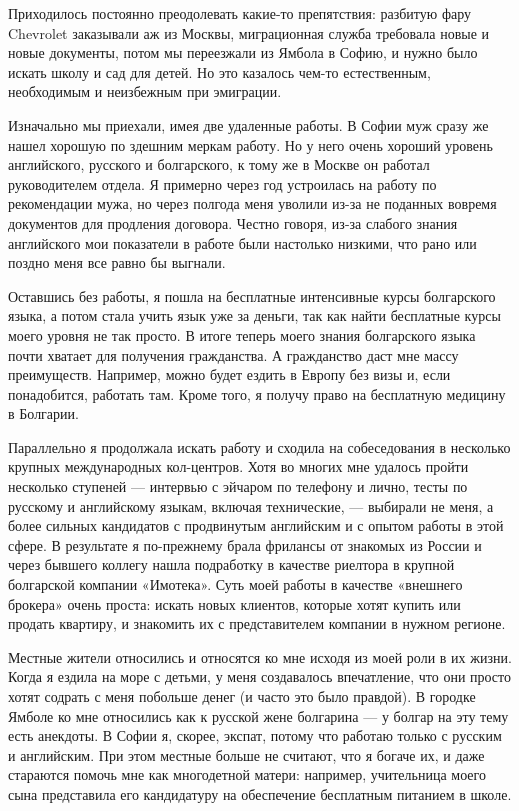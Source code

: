 Приходилось постоянно преодолевать какие-то препятствия: разбитую фару Chevrolet заказывали аж из Москвы, миграционная служба требовала новые и новые документы, потом мы переезжали из Ямбола в Софию, и нужно было искать школу и сад для детей. Но это казалось чем-то естественным, необходимым и неизбежным при эмиграции.


Изначально мы приехали, имея две удаленные работы. В Софии муж сразу же нашел хорошую по здешним меркам работу. Но у него очень хороший уровень английского, русского и болгарского, к тому же в Москве он работал руководителем отдела. Я примерно через год устроилась на работу по рекомендации мужа, но через полгода меня уволили из-за не поданных вовремя документов для продления договора. Честно говоря, из-за слабого знания английского мои показатели в работе были настолько низкими, что рано или поздно меня все равно бы выгнали.

Оставшись без работы, я пошла на бесплатные интенсивные курсы болгарского языка, а потом стала учить язык уже за деньги, так как найти бесплатные курсы моего уровня не так просто. В итоге теперь моего знания болгарского языка почти хватает для получения гражданства. А гражданство даст мне массу преимуществ. Например, можно будет ездить в Европу без визы и, если понадобится, работать там. Кроме того, я получу право на бесплатную медицину в Болгарии.

Параллельно я продолжала искать работу и сходила на собеседования в несколько крупных международных кол-центров. Хотя во многих мне удалось пройти несколько ступеней — интервью с эйчаром по телефону и лично, тесты по русскому и английскому языкам, включая технические, — выбирали не меня, а более сильных кандидатов с продвинутым английским и с опытом работы в этой сфере. В результате я по-прежнему брала фрилансы от знакомых из России и через бывшего коллегу нашла подработку в качестве риелтора в крупной болгарской компании «Имотека». Суть моей работы в качестве «внешнего брокера» очень проста: искать новых клиентов, которые хотят купить или продать квартиру, и знакомить их с представителем компании в нужном регионе.

Местные жители относились и относятся ко мне исходя из моей роли в их жизни. Когда я ездила на море с детьми, у меня создавалось впечатление, что они просто хотят содрать с меня побольше денег (и часто это было правдой). В городке Ямболе ко мне относились как к русской жене болгарина — у болгар на эту тему есть анекдоты. В Софии я, скорее, экспат, потому что работаю только с русским и английским. При этом местные больше не считают, что я богаче их, и даже стараются помочь мне как многодетной матери: например, учительница моего сына представила его кандидатуру на обеспечение бесплатным питанием в школе.

